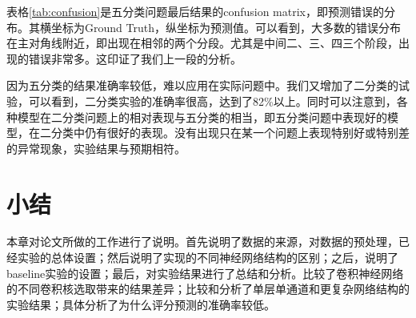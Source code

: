 表格\ref{tab:confusion}是五分类问题最后结果的confusion matrix，即预测错误的分布。其横坐标为Ground Truth，纵坐标为预测值。可以看到，大多数的错误分布在主对角线附近，即出现在相邻的两个分段。尤其是中间二、三、四三个阶段，出现的错误非常多。这印证了我们上一段的分析。

因为五分类的结果准确率较低，难以应用在实际问题中。我们又增加了二分类的试验，可以看到，二分类实验的准确率很高，达到了82\%以上。同时可以注意到，各种模型在二分类问题上的相对表现与五分类的相当，即五分类问题中表现好的模型，在二分类中仍有很好的表现。没有出现只在某一个问题上表现特别好或特别差的异常现象，实验结果与预期相符。

\section{小结}
本章对论文所做的工作进行了说明。首先说明了数据的来源，对数据的预处理，已经实验的总体设置；然后说明了实现的不同神经网络结构的区别；之后，说明了baseline实验的设置；最后，对实验结果进行了总结和分析。比较了卷积神经网络的不同卷积核选取带来的结果差异；比较和分析了单层单通道和更复杂网络结构的实验结果；具体分析了为什么评分预测的准确率较低。
